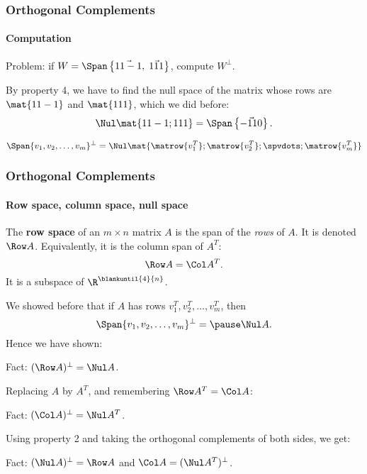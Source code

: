 \begin{frame}
\frametitle{Orthogonal Complements}
\framesubtitle{Computation}

\alert{Problem:} if $W = \Span\left\{ \vec{1 1 -1},\;\vec{1 1 1} \right\}$,
compute $W^\perp$.

\medskip
\begin{webonly}
By property \alert{4}, we have to find the null space of the matrix whose rows
are $\mat{1 1 -1}$ and $\mat{1 1 1}$, which we did before:
\[ \Nul\mat{1 1 -1; 1 1 1} = \Span\left\{ \vec{-1 1 0} \right\}. \]
\end{webonly}

\pause\medskip
\begin{bluebox}{.8\linewidth}
  \[ \Span\{v_1,v_2,\ldots,v_m\}^\perp=\Nul\mat{
    \matrow{v_1^T};
    \matrow{v_2^T};
              \spvdots;
    \matrow{v_m^T}} \]
\end{bluebox}

\end{frame}



\begin{frame}
\frametitle{Orthogonal Complements}
\framesubtitle{Row space, column space, null space}

\vskip-3mm
\begin{defn}
  The \textbf{row space} of an $m\times n$ matrix $A$ is the span of the
  \emph{rows} of $A$.  It is denoted $\Row A$.
  \pause
  Equivalently, it is the column span of $A^T$:
  \[ \Row A = \Col A^T. \]
  \pause
  It is a subspace of $\R^{\blankuntil{4}{n}}$.
\end{defn}

\pause[5]\medskip
We showed before that if $A$ has rows $v_1^T,v_2^T,\ldots,v_m^T$, then 
\[ \Span\{v_1,v_2,\ldots,v_m\}^\perp = \pause\Nul A. \]
\pause
Hence we have shown:

\medskip
\alert{Fact:} $(\Row A)^\perp = \Nul A$.

\pause\medskip
Replacing $A$ by $A^T$, and remembering $\Row A^T = \Col A$:

\pause\medskip
\alert{Fact:} $(\Col A)^\perp = \Nul A^T$.

\pause\medskip
Using property \alert{2} and taking the orthogonal complements of both sides, 
we get:

\pause\medskip
\alert{Fact:} $(\Nul A)^\perp = \Row A$ and
$\Col A = (\Nul A^T)^\perp$.

\end{frame}



